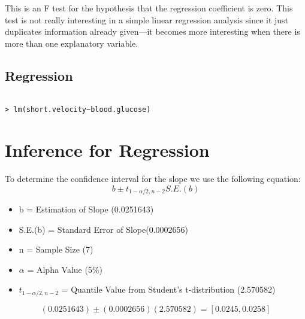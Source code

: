 This is an F test for the hypothesis that the regression coefficient is zero. This test is not really interesting in a
simple linear regression analysis since it just duplicates information already given—it becomes more interesting when there is more than one explanatory variable.

\subsection{Regression}

\begin{verbatim}

> lm(short.velocity~blood.glucose)
\end{verbatim}

\section{Inference for Regression}
To determine the confidence interval for the slope we use the
following equation:
\begin{equation}
b \pm t_{1-\alpha/2,n-2} S.E.(b)
\end{equation}

\begin{itemize}
\item b = Estimation of Slope (0.0251643) \item S.E.(b) = Standard
Error of Slope(0.0002656) \item n = Sample Size (7) \item $\alpha$
= Alpha Value (5\%) \item $t_{1-\alpha/2,n-2}$ = Quantile Value
from Student’s t-distribution (2.570582)
\end{itemize}

\begin{equation}
(0.0251643) \pm (0.0002656)(2.570582) = [ 0.0245,0.0258 ]
\end{equation}









